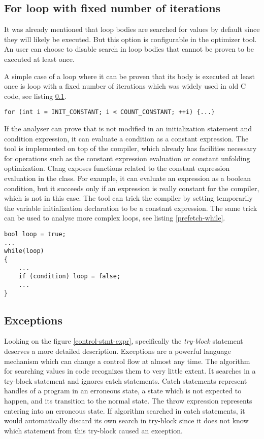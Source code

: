 \subsection{For loop with fixed number of iterations}
\label{prefetch-for}
It was already mentioned that loop bodies are searched for values by default since they will likely be executed. But this option is configurable in the optimizer tool. An user can choose to disable search in loop bodies that cannot be proven to be executed at least once.

A simple case of a loop where it can be proven that its body is executed at least once is  loop with a fixed number of iterations which was widely used in old C code, see listing \ref{prefetch-for}.

\begin{lstlisting}[caption={\code{for} loop with constant number of iterations.}, label={prefetch-for}]
for (int i = INIT_CONSTANT; i < COUNT_CONSTANT; ++i) {...}
\end{lstlisting}

If the analyser can prove that  is not modified in an initialization statement and condition expression, it can evaluate a condition as a constant expression. The tool is implemented on top of the compiler, which already has facilities necessary for operations such as the constant expression evaluation or constant unfolding optimization. Clang exposes functions related to the constant expression evaluation in the  class. For example, it can evaluate an expression as a boolean condition, but it succeeds only if an expression is really constant for the compiler, which is not in this case. The tool can trick the compiler by setting temporarily the variable initialization declaration to be a constant expression. The same trick can be used to analyse more complex loops, see listing \ref{prefetch-while}.

\begin{lstlisting}[caption={Example of more complex loop with at least one body execution.}, label={prefetch-while}]
bool loop = true;
...
while(loop)
{
    ...
    if (condition) loop = false;
    ...
}
\end{lstlisting}

\subsection{Exceptions}
Looking on the figure \ref{control-stmt-expr}, specifically the \emph{try-block} statement deserves a more detailed description. Exceptions are a powerful language mechanism which can change a control flow at almost any time. The algorithm for searching values in code recognizes them to very little extent. It searches in a try-block statement and ignores catch statements. Catch statements represent handles of a program in an erroneous state, a state which is not expected to happen, and its transition to the normal state. The throw expression represents entering into an erroneous state. If algorithm searched in catch statements, it would automatically discard its own search in try-block since it does not know which statement from this try-block caused an exception.

